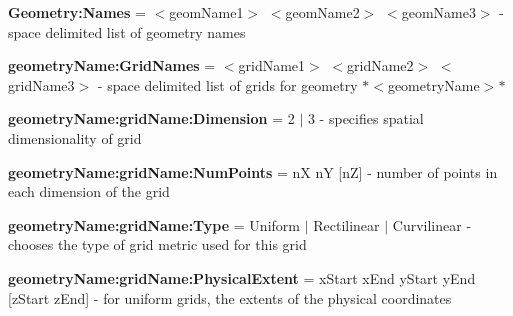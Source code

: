 \begin{DoxyItemize}
\item {\bfseries Geometry\+:Names} = $<$geom\+Name1$>$ $<$geom\+Name2$>$ $<$geom\+Name3$>$ -\/ space delimited list of geometry names
\item {\bfseries geometry\+Name\+:Grid\+Names} = $<$grid\+Name1$>$ $<$grid\+Name2$>$ $<$grid\+Name3$>$ -\/ space delimited list of grids for geometry $\ast$$<$geometry\+Name$>$$\ast$
\item {\bfseries geometry\+Name\+:grid\+Name\+:Dimension} = 2 $\vert$ 3 -\/ specifies spatial dimensionality of grid
\item {\bfseries geometry\+Name\+:grid\+Name\+:Num\+Points} = nX nY \mbox{[}nZ\mbox{]} -\/ number of points in each dimension of the grid
\item {\bfseries geometry\+Name\+:grid\+Name\+:Type} = Uniform $\vert$ Rectilinear $\vert$ Curvilinear -\/ chooses the type of grid metric used for this grid
\item {\bfseries geometry\+Name\+:grid\+Name\+:Physical\+Extent} = x\+Start x\+End y\+Start y\+End \mbox{[}z\+Start z\+End\mbox{]} -\/ for uniform grids, the extents of the physical coordinates

\end{DoxyItemize}
